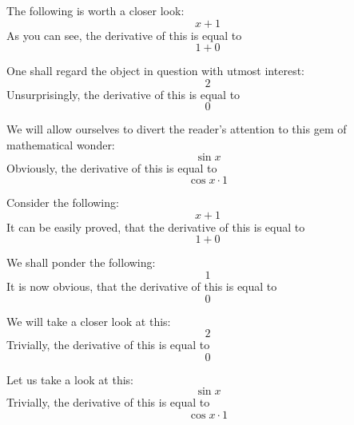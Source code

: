 \documentclass{article}
\begin{document}
The following is worth a closer look:
\begin{equation}
x + 1 
\end{equation}
As you can see, the derivative of this is equal to
\begin{equation}
1 + 0 
\end{equation}

One shall regard the object in question with utmost interest:
\begin{equation}
2 
\end{equation}
Unsurprisingly, the derivative of this is equal to
\begin{equation}
0 
\end{equation}

We will allow ourselves to divert the reader's attention to this gem of mathematical wonder:
\begin{equation}
\sin x 
\end{equation}
Obviously, the derivative of this is equal to
\begin{equation}
\cos x \cdot 1 
\end{equation}

Consider the following:
\begin{equation}
x + 1 
\end{equation}
It can be easily proved, that the derivative of this is equal to
\begin{equation}
1 + 0 
\end{equation}

We shall ponder the following:
\begin{equation}
1 
\end{equation}
It is now obvious, that the derivative of this is equal to
\begin{equation}
0 
\end{equation}

We will take a closer look at this:
\begin{equation}
2 
\end{equation}
Trivially, the derivative of this is equal to
\begin{equation}
0 
\end{equation}

Let us take a look at this:
\begin{equation}
\sin x 
\end{equation}
Trivially, the derivative of this is equal to
\begin{equation}
\cos x \cdot 1 
\end{equation}
\end{document}
